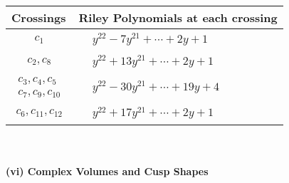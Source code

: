 \documentclass[1p]{elsarticle_modified}
\theoremstyle{definition}
\begin{document}
\begin{tabular}{m{50pt}|m{274pt}}
Crossings & \hspace{64pt}Riley Polynomials at each crossing \\
\hline $$\begin{aligned}c_{1}\end{aligned}$$&$\begin{aligned}
&y^{22}-7 y^{21}+\cdots+2 y+1
\end{aligned}$\\
\hline $$\begin{aligned}c_{2},c_{8}\end{aligned}$$&$\begin{aligned}
&y^{22}+13 y^{21}+\cdots+2 y+1
\end{aligned}$\\
\hline $$\begin{aligned}c_{3},c_{4},c_{5}\\c_{7},c_{9},c_{10}\end{aligned}$$&$\begin{aligned}
&y^{22}-30 y^{21}+\cdots+19 y+4
\end{aligned}$\\
\hline $$\begin{aligned}c_{6},c_{11},c_{12}\end{aligned}$$&$\begin{aligned}
&y^{22}+17 y^{21}+\cdots+2 y+1
\end{aligned}$\\
\hline
\end{tabular}\\~\\
\newpage\flushleft \textbf{(vi) Complex Volumes and Cusp Shapes}
\end{document}
